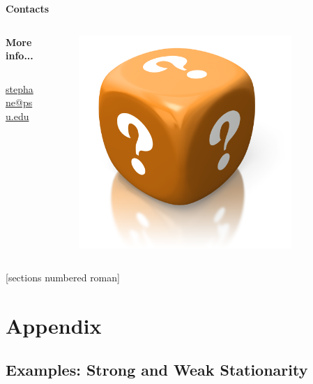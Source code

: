 \documentclass[envcountsect,usenames,dvipsnames]{beamer}
\theoremstyle{mystyle}
\begin{document}
\begin{frame}{\textbf{Contacts}}
\begin{columns}
\begin{column}{0.5\textwidth}
\begin{block}{\textbf{More info...}}
\begin{columns}
\begin{column}{0.85\textwidth}
	\vspace{0.05cm}	
	\href{mailto:stephane@psu.edu}{stephane@psu.edu}
	
	\end{column}
	\end{columns}
	\end{block}
	
	\end{column}
	\begin{column}{0.5\textwidth}
		\begin{figure}[!hb]
		  \centering
		 \includegraphics[width=0.85\textwidth]{Images/question_one_red_dice}
	\end{figure}
	\end{column}
	\end{columns}

\end{frame}

[sections numbered roman]

\renewcommand{\thesubsection}{\secname $\,$ \Alph{subsection}}

\appendix


\section{Appendix}

\subsection{Examples: Strong and Weak Stationarity}
\label{app:strong:weak}
\end{document}
